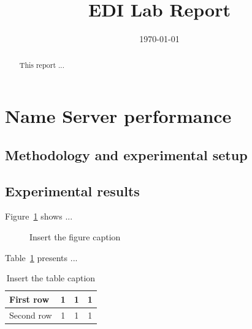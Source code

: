 \documentclass[a4paper,10pt]{article}
\begin{document}
\title{EDI Lab Report}
\author{}
\date{\today}

\maketitle

\begin{abstract}
This report ... 
\end{abstract}




\section{Name Server performance}
\subsection{Methodology and experimental setup}
\subsection{Experimental results}

Figure~\ref{fig:label1} shows ...

\begin{figure}[htb]
	\centering
		\caption{Insert the figure caption}
		\label{fig:label1}
\end{figure}

Table~\ref{tab:label1} presents ...

\begin{table}[htb]
	\centering
	\begin{tabular}{l|c|c|c}
First row	&	1 &1 & 1\\
\hline
Second row &	1 &1 & 1\\
	\end{tabular}
	\caption{Insert the table caption}
	\label{tab:label1}
\end{table}
\end{document}
